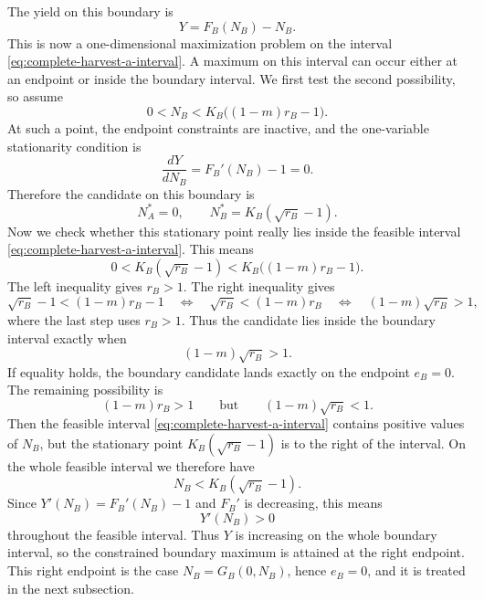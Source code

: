 \documentclass{article}
\numberwithin{equation}{section}
\begin{document}
The yield on this boundary is
\begin{equation}
    \label{eq:complete-harvest-a-yield-function}
    Y=F_B(N_B)-N_B.
\end{equation}
This is now a one-dimensional maximization problem on the interval
\eqref{eq:complete-harvest-a-interval}. A maximum on this interval
can occur either at an endpoint or inside the boundary interval. We first
test the second possibility, so assume
\begin{equation*}
    0<N_B<K_B\bigl((1-m)r_B-1\bigr).
\end{equation*}
At such a point, the endpoint constraints are inactive, and the
one-variable stationarity condition is
\begin{equation*}
    \frac{dY}{dN_B}=F_B'(N_B)-1=0.
\end{equation*}
Therefore the candidate on this boundary is
\begin{equation}
    \label{eq:complete-harvest-a-population}
    N_A^*=0,
    \qquad
    N_B^*=K_B(\sqrt{r_B}-1).
\end{equation}
Now we check whether this stationary point really lies inside the feasible
interval \eqref{eq:complete-harvest-a-interval}. This means
\begin{equation*}
    0<K_B(\sqrt{r_B}-1)<K_B\bigl((1-m)r_B-1\bigr).
\end{equation*}
The left inequality gives $r_B>1$. The right inequality gives
\begin{equation*}
    \sqrt{r_B}-1<(1-m)r_B-1
    \quad\Longleftrightarrow\quad
    \sqrt{r_B}<(1-m)r_B
    \quad\Longleftrightarrow\quad
    (1-m)\sqrt{r_B}>1,
\end{equation*}
where the last step uses $r_B>1$. Thus the candidate lies inside the
boundary interval exactly when
\begin{equation}
    \label{eq:complete-harvest-a-interval-condition}
    (1-m)\sqrt{r_B}>1.
\end{equation}
If equality holds, the boundary candidate lands exactly on the endpoint
$e_B=0$. The remaining possibility is
\begin{equation*}
    (1-m)r_B>1
    \qquad\text{but}\qquad
    (1-m)\sqrt{r_B}<1.
\end{equation*}
Then the feasible interval
\eqref{eq:complete-harvest-a-interval} contains positive values of
$N_B$, but the stationary point $K_B(\sqrt{r_B}-1)$ is to the right of the
interval. On the whole feasible interval we therefore have
\begin{equation*}
    N_B<K_B(\sqrt{r_B}-1).
\end{equation*}
Since $Y'(N_B)=F_B'(N_B)-1$ and $F_B'$ is decreasing, this means
\begin{equation*}
    Y'(N_B)>0
\end{equation*}
throughout the feasible interval. Thus $Y$ is increasing on the whole
boundary interval, so the constrained boundary maximum is attained at the
right endpoint. This right endpoint is the case $N_B=G_B(0,N_B)$, hence
$e_B=0$, and it is treated in the next subsection.
\end{document}
